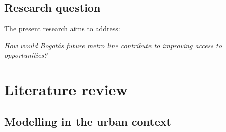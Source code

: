 \documentclass[12pt, a4paper]{report}
\begin{document}
\section{Research question}

The present research aims to address:







\begin{center}
    \textit{How would Bogot\'{a}\textquotesingle s future metro line contribute to improving access to opportunities?} 
\end{center}





\chapter{Literature review} \label{Chap2}

\section{Modelling in the urban context}
\end{document}
